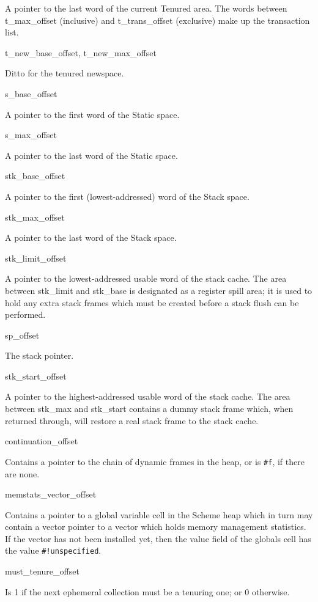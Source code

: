 \begin{description}
A pointer to the last word of the current Tenured area.
The words between {\sc t\_max\_offset} (inclusive) and 
{\sc t\_trans\_offset} (exclusive) make up the transaction list.

\item {\sc t\_new\_base\_offset, t\_new\_max\_offset}

Ditto for the tenured newspace.

\item {\sc s\_base\_offset}

A pointer to the first word of the Static space.

\item {\sc s\_max\_offset}

A pointer to the last word of the Static space.

\item {\sc stk\_base\_offset}

A pointer to the first (lowest-addressed) word of the Stack space.

\item {\sc stk\_max\_offset}

A pointer to the last word of the Stack space.

\item {\sc stk\_limit\_offset}

A pointer to the lowest-addressed usable word of the stack cache. The area
between stk\_limit and stk\_base is designated as a register spill area; it
is used to hold any extra stack frames which must be created before a
stack flush can be performed.

\item {\sc sp\_offset}

The stack pointer.

\item {\sc stk\_start\_offset}

A pointer to the highest-addressed usable word of the stack cache. The area
between stk\_max and stk\_start contains a dummy stack frame which, when
returned through, will restore a real stack frame to the stack cache.

\item {\sc continuation\_offset}

Contains a pointer to the chain of dynamic frames in the heap, or is
\verb+#f+, if there are none.

\item {\sc memstats\_vector\_offset}

Contains a pointer to a global variable cell in the Scheme heap which in
turn may contain a vector pointer to a vector which holds memory management
statistics. If the vector has not been installed yet, then the value field
of the globals cell has the value \verb+#!unspecified+.

\item {\sc must\_tenure\_offset}

Is 1 if the next ephemeral collection must be a tenuring one; or 0 otherwise.

\end{description}

